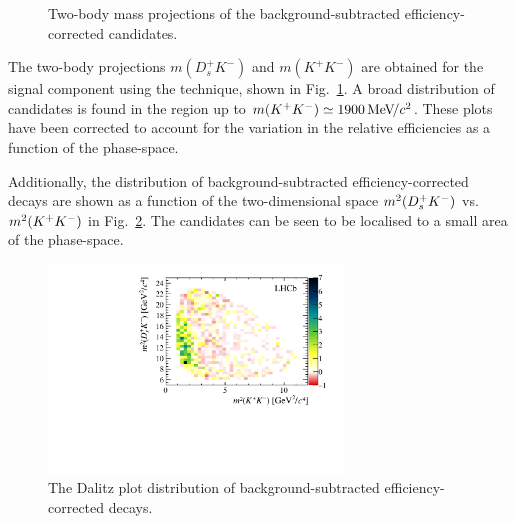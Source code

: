 \begin{figure}[!h]
\begin{subfigure}[t]{0.49\textwidth}
    \end{subfigure}
    \caption{Two-body mass projections of the background-subtracted efficiency-corrected \decay{\Bp}{\Dsp\Kp\Km} candidates.}
    \label{fig:B2DsKK_twobodyprojections}
\end{figure}

The two-body projections $m(D_{s}^{+}K^{-})$ and $m(K^{+}K^{-})$ are obtained for the signal component using the \sPlot technique, shown in Fig.~\ref{fig:B2DsKK_twobodyprojections}. A broad distribution of candidates is found in the region up to $m({{K}^+}{{K}^-}) \simeq 1900 {\mathrm{\,Me\kern -0.1em V\!/}c^2}$. These plots have been corrected to account for the variation in the relative efficiencies as a function of the phase-space.



Additionally, the distribution of background-subtracted efficiency-corrected \decay{\Bp}{\Dsp\Kp\Km} decays are shown as a function of the two-dimensional space $m^{2}({{D}^+_{s}}{{K}^-})$ vs. $m^{2}({{K}^+}{{K}^-})$ in Fig.~\ref{fig:B2DsKK_Dalitzplot}. The candidates can be seen to be localised to a small area of the phase-space. 

\begin{figure}[!h]
    \centering
    \includegraphics[width=0.7\textwidth]{figs/B2DsKK/Dalitz_plot_sweighted.pdf}
    \caption{The Dalitz plot distribution of background-subtracted efficiency-corrected \decay{\Bp}{\Dsp\Kp\Km} decays.}
    \label{fig:B2DsKK_Dalitzplot}   
\end{figure}



